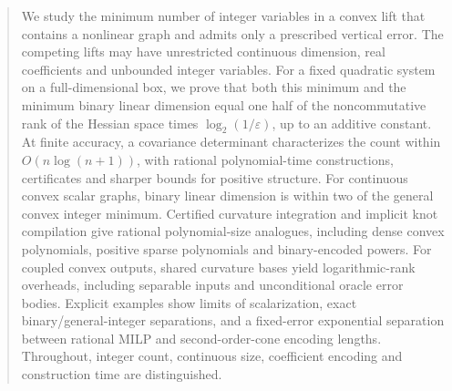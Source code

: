 \begin{abstract}
We study the minimum number of integer variables in a convex lift that
contains a nonlinear graph and admits only a prescribed vertical error.
The competing lifts may have unrestricted continuous dimension, real
coefficients and unbounded integer variables. For a fixed quadratic
system on a full-dimensional box, we prove that both this minimum and
the minimum binary linear dimension equal one half of the noncommutative
rank of the Hessian space times $\log_2(1/\varepsilon)$, up to an additive
constant. At finite accuracy, a covariance determinant characterizes the
count within $O(n\log(n+1))$, with rational polynomial-time constructions,
certificates and sharper bounds for positive structure. For continuous
convex scalar graphs, binary linear dimension is within two of the general
convex integer minimum. Certified curvature integration and implicit knot
compilation give rational polynomial-size analogues, including dense convex
polynomials, positive sparse polynomials and binary-encoded powers.
For coupled convex outputs, shared curvature bases yield logarithmic-rank
overheads, including separable inputs and unconditional oracle error bodies.
Explicit examples show limits of scalarization, exact binary/general-integer
separations, and a fixed-error exponential separation between rational
MILP and second-order-cone encoding lengths. Throughout, integer count,
continuous size, coefficient encoding and construction time are distinguished.
\end{abstract}
